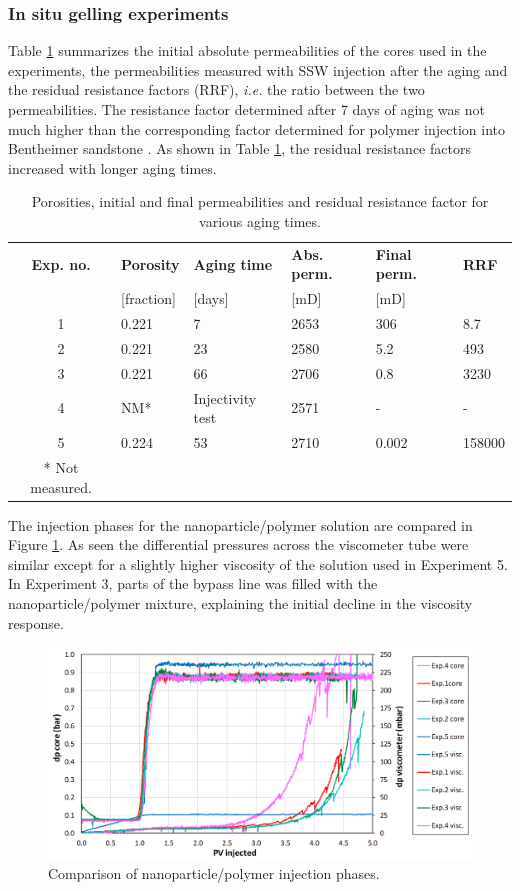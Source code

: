 \documentclass[nanomaterials,article,submit,moreauthors,pdftex]{Definitions/mdpi}
\begin{document}
\subsubsection{In situ gelling experiments \label{sec:insiteGel}}
Table \ref{tab:porPermAge} summarizes the initial absolute permeabilities of the cores used in the experiments, the permeabilities measured with SSW injection after the aging and the residual resistance factors (RRF), \textit{i.e.} the ratio between the two permeabilities. The resistance factor determined after 7 days of aging was not much higher than the corresponding factor determined for polymer injection into Bentheimer sandstone \cite{Najafiazar2016}. As shown in Table \ref{tab:porPermAge}, the residual resistance factors increased with longer aging times.
\begin{table}[h!]
\small
\centering
\caption{Porosities, initial and final permeabilities and residual resistance factor for various aging times.}
\label{tab:porPermAge} %
\begin{tabular}{c l l l l l } 
\toprule
\textbf{Exp. no.} & \textbf{Porosity} & \textbf{Aging time} & \textbf{Abs. perm.} & \textbf{Final perm.} & \textbf{RRF} \\ 
 & [fraction] & [days] & [mD] & [mD] & \\
\midrule 
1  & 0.221   &  7     & 2653     & 306      & 8.7    \\
2  & 0.221   & 23     & 2580     & 5.2      & 493      \\ 
3  & 0.221   & 66     & 2706     & 0.8    & 3230   \\ 
4  & NM* & Injectivity test & 2571    & -        & -      \\
5  & 0.224   & 53     & 2710     & 0.002        & 158000      \\
\bottomrule
* Not measured.
\end{tabular}
\end{table}

The injection phases for the nanoparticle/polymer solution are compared in Figure \ref{cht:gelexp_sum}. As seen the differential pressures across the viscometer tube were similar except for a slightly higher viscosity of the solution used in Experiment 5. In Experiment 3, parts of the bypass line was filled with the nanoparticle/polymer mixture, explaining the initial decline in the viscosity response. 

\begin{figure}[h!]
    \centering
    \includegraphics[width=.8\textwidth]{fig/gelexp_sum.png}
    \caption{Comparison of nanoparticle/polymer injection phases.}
    \label{cht:gelexp_sum} %
\end{figure}
 
\end{document}
